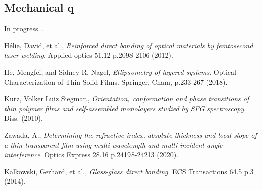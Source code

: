 \documentclass[colorlinks=true,pdfstartview=FitV,linkcolor=blue,
            citecolor=red,urlcolor=magenta]{ligodoc}
\begin{document}
\subsection{Mechanical q}

In progress...

\begin{thebibliography}{9}
    
	  Hélie, David, et al.,
	  \emph{Reinforced direct bonding of optical materials by femtosecond laser welding}.
	  Applied optics 51.12 p.2098-2106 (2012).    

	  He, Mengfei, and Sidney R. Nagel,
	  \emph{Ellipsometry of layered systems}.
	  Optical Characterization of Thin Solid Films. Springer, Cham, p.233-267 (2018).

	  Kurz, Volker Luiz Siegmar.,
	  \emph{Orientation, conformation and phase transitions of thin polymer films and self-assembled monolayers studied by SFG spectroscopy}.
	  Diss. (2010).

	  Zawada, A.,
	  \emph{Determining the refractive index, absolute thickness and local slope of a thin transparent film using multi-wavelength and multi-incident-angle interference}.
	  Optics Express 28.16 p.24198-24213 (2020).
  
	  Kalkowski, Gerhard, et al.,
	  \emph{Glass-glass direct bonding}.
	  ECS Transactions 64.5 p.3 (2014).
 
\end{thebibliography} %
\end{document}
